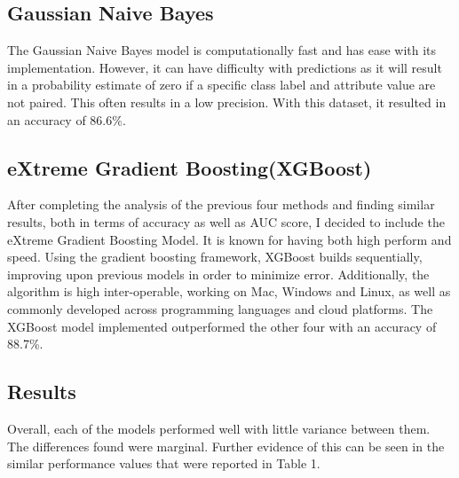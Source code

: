 \documentclass{article}
\begin{document}
\subsection{Gaussian Naive Bayes}
The Gaussian Naive Bayes model is computationally fast and has ease with its implementation. However, it can have difficulty with predictions as it will result in a probability estimate of zero if a specific class label and attribute value are not paired. This often results in a low precision. With this dataset, it resulted in an accuracy of 86.6\%. 
\subsection{eXtreme Gradient Boosting(XGBoost)}
After completing the analysis of the previous four methods and finding similar results, both in terms of accuracy as well as AUC score, I decided to include the eXtreme Gradient Boosting Model. It is known for having both high perform and speed. Using the gradient boosting framework, XGBoost builds sequentially, improving upon previous models in order to minimize error. Additionally, the algorithm is high inter-operable, working on Mac, Windows and Linux, as well as commonly developed across programming languages and cloud platforms. The XGBoost model implemented outperformed the other four with an accuracy of 88.7\%.
\subsection{Results}
Overall, each of the models performed well with little variance between them. The differences found were marginal. Further evidence of this can be seen in the similar performance values that were reported in Table 1. 
\end{document}

